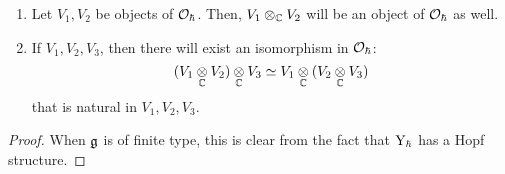         \begin{proposition}
            \begin{enumerate}
                \item Let $V_1, V_2$ be objects of $\mathcal{O}_{\hbar}$. Then, $V_1 \tensor_{\bbC} V_2$ will be an object of $\mathcal{O}_{\hbar}$ as well.
                \item If $V_1, V_2, V_3$, then there will exist an isomorphism in $\mathcal{O}_{\hbar}$:
                    $$(V_1 \tensor_{\bbC} V_2) \tensor_{\bbC} V_3 \cong V_1 \tensor_{\bbC} (V_2 \tensor_{\bbC} V_3)$$
                that is natural in $V_1, V_2, V_3$.
            \end{enumerate}  
        \end{proposition}
            \begin{proof}
                When $\mathfrak{g}$ is of finite type, this is clear from the fact that $\mathrm{Y}_{\hbar}$ has a Hopf structure. 
            \end{proof}